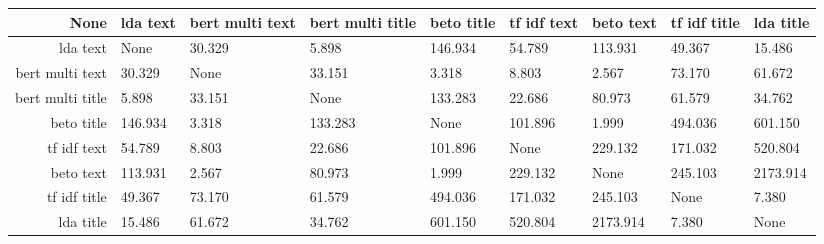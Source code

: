 \begin{tabular}{|r|l|l|l|l|l|l|l|l|}
  \hline
  None & lda text & bert multi text & bert multi title & beto title & tf idf text & beto text & tf idf title & lda title \\ 
  \hline
  lda text & None & 30.329 & 5.898 & 146.934 & 54.789 & 113.931 & 49.367 & 15.486 \\ 
  \hline
  bert multi text & 30.329 & None & 33.151 & 3.318 & 8.803 & 2.567 & 73.170 & 61.672 \\ 
  \hline
  bert multi title & 5.898 & 33.151 & None & 133.283 & 22.686 & 80.973 & 61.579 & 34.762 \\ 
  \hline
  beto title & 146.934 & 3.318 & 133.283 & None & 101.896 & 1.999 & 494.036 & 601.150 \\ 
  \hline
  tf idf text & 54.789 & 8.803 & 22.686 & 101.896 & None & 229.132 & 171.032 & 520.804 \\ 
  \hline
  beto text & 113.931 & 2.567 & 80.973 & 1.999 & 229.132 & None & 245.103 & 2173.914 \\ 
  \hline
  tf idf title & 49.367 & 73.170 & 61.579 & 494.036 & 171.032 & 245.103 & None & 7.380 \\ 
  \hline
  lda title & 15.486 & 61.672 & 34.762 & 601.150 & 520.804 & 2173.914 & 7.380 & None \\ 
  \hline
\end{tabular}
